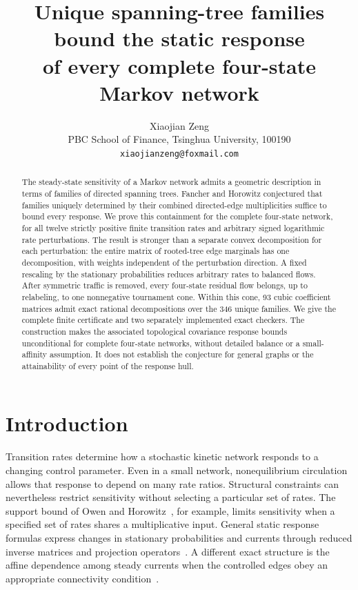\documentclass[11pt,a4paper]{article}
\title{Unique spanning-tree families bound the static response\protect\\
of every complete four-state Markov network}
\author{Xiaojian Zeng\\[3pt]
\small PBC School of Finance, Tsinghua University, 100190\\
\small \texttt{xiaojianzeng@foxmail.com}}
\date{}
\begin{document}
\maketitle
\begin{abstract}
The steady-state sensitivity of a Markov network admits a geometric
description in terms of families of directed spanning trees. Fancher and
Horowitz conjectured that families uniquely determined by their combined
directed-edge multiplicities suffice to bound every response. We prove
this containment for the complete four-state network, for all twelve
strictly positive finite transition rates and arbitrary signed
logarithmic rate perturbations. The result is stronger than a separate
convex decomposition for each perturbation: the entire matrix of rooted-tree
edge marginals has one decomposition, with weights independent of the
perturbation direction. A fixed rescaling by the stationary probabilities
reduces arbitrary rates to balanced flows. After symmetric traffic is
removed, every four-state residual flow belongs, up to relabeling, to one
nonnegative tournament cone. Within this cone, 93 cubic coefficient
matrices admit exact rational decompositions over the 346 unique families.
We give the complete finite certificate and two separately implemented
exact checkers. The construction makes the associated topological
covariance response bounds unconditional for complete four-state
networks, without detailed balance or a small-affinity assumption. It
does not establish the conjecture for general graphs or the attainability
of every point of the response hull.
\end{abstract}

\section{Introduction}

Transition rates determine how a stochastic kinetic network responds to
a changing control parameter. Even in a small network, nonequilibrium
circulation allows that response to depend on many rate ratios. Structural
constraints can nevertheless restrict sensitivity without selecting a
particular set of rates. The support bound of Owen and
Horowitz~\cite{OwenHorowitz2023}, for example, limits sensitivity when a
specified set of rates shares a multiplicative input. General static
response formulas express changes in stationary probabilities and
currents through reduced inverse matrices and projection
operators~\cite{AslyamovEsposito2024}. A different exact structure is the
affine dependence among steady currents when the controlled edges obey
an appropriate connectivity condition~\cite{DalCengio2025}.
\end{document}
